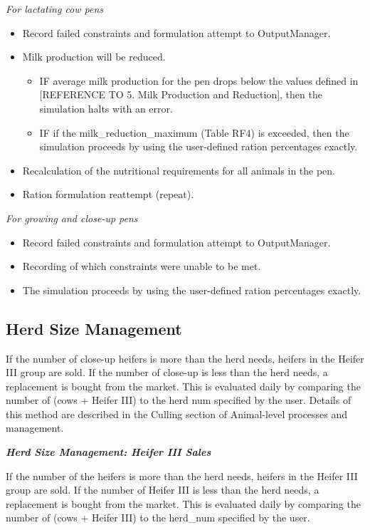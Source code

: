 \documentclass{article}
\begin{document}
\begin{refsection}
\textit{For lactating cow pens}
\begin{itemize}
    \item Record failed constraints and formulation attempt to OutputManager.
    \item Milk production will be reduced.
    \begin{itemize}
        \item IF average milk production for the pen drops below the values defined in [REFERENCE TO 5. Milk Production and Reduction], then the simulation halts with an error.
        \item IF if the milk\_reduction\_maximum (Table RF4) is exceeded, then the simulation proceeds by using the user-defined ration percentages exactly.
    \end{itemize}
    \item Recalculation of the nutritional requirements for all animals in the pen.
    \item Ration formulation reattempt (repeat).
\end{itemize}

\textit{For growing and close-up pens}
\begin{itemize}
    \item Record failed constraints and formulation attempt to OutputManager.
    \item Recording of which constraints were unable to be met.
    \item The simulation proceeds by using the user-defined ration percentages exactly.


\end{itemize}

\subsection{Herd Size Management}
If the number of close-up heifers is more than the herd needs, heifers in the Heifer III group are sold. If the number of close-up is less than the herd needs, a replacement is bought from the market. This is evaluated daily by comparing the number of (cows + Heifer III) to the herd num specified by the user.
Details of this method are described in the Culling section of Animal-level processes and management. 
\vspace{0.5cm}

    \textbf{\textit{Herd Size Management: Heifer III Sales}}
    \vspace{0.2cm}
    
    If the number of the heifers is more than the herd needs, heifers in the Heifer III group are sold. If the number of Heifer III is less than the herd needs, a replacement is bought from the market. This is evaluated daily by comparing the number of (cows + Heifer III) to the herd\_num specified by the user. 
        \vspace{0.2cm}
        

\end{refsection}
\end{document}
